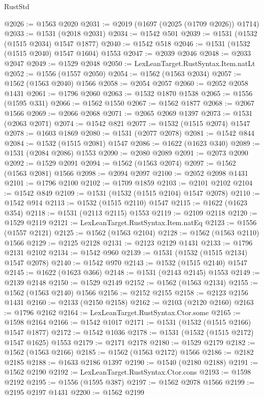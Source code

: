 \begin{lexlean}{RustStd}
\begin{coremodule}
@2026 := @1563 @2020
@2031 := @2019 (@1697 (@2025 (@1709 @2026)) @1714)
@2033 := @1531 (@2018 @2031)
@2034 := @1542 @501
@2039 := @1531 (@1532 (@1515 @2034) @1547 @1877)
@2040 := @1542 @518
@2046 := @1531 (@1532 (@1515 @2040) @1547 @1604) @1553
@2047 := @2039 @2046
@2048 := @2033 @2047
@2049 := @1529 @2048
@2050 := LexLeanTarget.RustSyntax.Item.natLt
@2052 := @1556 (@1557 @2050)
@2054 := @1562 (@1563 @2034)
@2057 := @1562 (@1563 @2040) @1566
@2058 := @2054 @2057
@2060 := @2052 @2058 @1431
@2061 := @1796 @2060
@2063 := @1532 @1870 @1538
@2065 := @1556 (@1595 @331)
@2066 := @1562 @1550
@2067 := @1562 @1877
@2068 := @2067 @1566
@2069 := @2066 @2068
@2071 := @2065 @2069 @1397
@2073 := @1531 (@2063 @2071)
@2074 := @1542 @821
@2077 := @1532 (@1515 @2074) @1547
@2078 := @1603 @1869
@2080 := @1531 (@2077 @2078)
@2081 := @1542 @844
@2084 := @1532 (@1515 @2081) @1547
@2086 := @1622 (@1623 @340)
@2089 := @1531 (@2084 @2086) @1553
@2090 := @2080 @2089
@2091 := @2073 @2090
@2092 := @1529 @2091
@2094 := @1562 (@1563 @2074)
@2097 := @1562 (@1563 @2081) @1566
@2098 := @2094 @2097
@2100 := @2052 @2098 @1431
@2101 := @1796 @2100
@2102 := @1709 @1859
@2103 := @2101 @2102
@2104 := @1542 @849
@2109 := @1531 (@1532 (@1515 @2104) @1547 @2078)
@2110 := @1542 @914
@2113 := @1532 (@1515 @2110) @1547
@2115 := @1622 (@1623 @354)
@2118 := @1531 (@2113 @2115) @1553
@2119 := @2109 @2118
@2120 := @1529 @2119
@2121 := LexLeanTarget.RustSyntax.Item.natEq
@2123 := @1556 (@1557 @2121)
@2125 := @1562 (@1563 @2104)
@2128 := @1562 (@1563 @2110) @1566
@2129 := @2125 @2128
@2131 := @2123 @2129 @1431
@2133 := @1796 @2131 @2102
@2134 := @1542 @960
@2139 := @1531 (@1532 (@1515 @2134) @1547 @2078)
@2140 := @1542 @970
@2143 := @1532 (@1515 @2140) @1547
@2145 := @1622 (@1623 @366)
@2148 := @1531 (@2143 @2145) @1553
@2149 := @2139 @2148
@2150 := @1529 @2149
@2152 := @1562 (@1563 @2134)
@2155 := @1562 (@1563 @2140) @1566
@2156 := @2152 @2155
@2158 := @2123 @2156 @1431
@2160 := @2133 (@2150 @2158)
@2162 := @2103 (@2120 @2160)
@2163 := @1796 @2162
@2164 := LexLeanTarget.RustSyntax.Ctor.some
@2165 := @1598 @2164
@2166 := @1542 @1017
@2171 := @1531 (@1532 (@1515 @2166) @1547 @1877)
@2172 := @1542 @1036
@2178 := @1531 (@1532 (@1515 @2172) @1547 @1625) @1553
@2179 := @2171 @2178
@2180 := @1529 @2179
@2182 := @1562 (@1563 @2166)
@2185 := @1562 (@1563 @2172) @1566
@2186 := @2182 @2185
@2188 := @1633 @2186 @1397
@2190 := @1540 (@2180 @2188)
@2191 := @1562 @2190
@2192 := LexLeanTarget.RustSyntax.Ctor.cons
@2193 := @1598 @2192
@2195 := @1556 (@1595 @387)
@2197 := @1562 @2078 @1566
@2199 := @2195 @2197 @1431
@2200 := @1562 @2199

\end{coremodule}
\end{lexlean}
